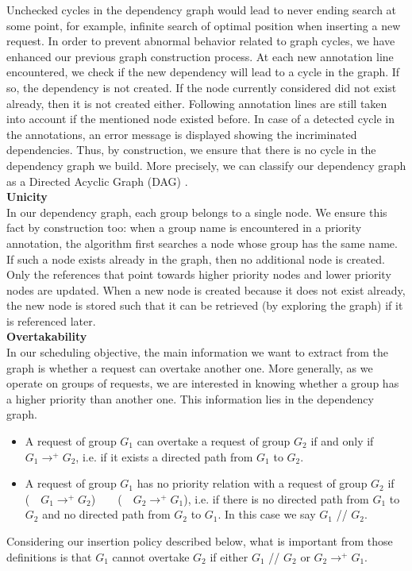 \documentclass[11pt]{report}
\begin{document}
Unchecked cycles in the dependency graph would lead to never ending search at some point, for example, infinite search of optimal position when inserting a new request. In order to prevent abnormal behavior related to graph cycles, we have enhanced our previous graph construction process. At each new annotation line encountered, we check if the new dependency will lead to a cycle in the graph. If so, the dependency is not created. If the node currently considered did not exist already, then it is not created either. Following annotation lines are still taken into account if the mentioned node existed before. In case of a detected cycle in the annotations, an error message is displayed showing the incriminated dependencies. Thus, by construction, we ensure that there is no cycle in the dependency graph we build. More precisely, we can classify our dependency graph as a Directed Acyclic Graph (DAG) \cite{ref:gallai1968directed}.\\

\textbf{Unicity}\\
In our dependency graph, each group belongs to a single node. We ensure this fact by construction too: when a group name is encountered in a priority annotation, the algorithm first searches a node whose group has the same name. If such a node exists already in the graph, then no additional node is created. Only the references that point towards higher priority nodes and lower priority nodes are updated. When a new node is created because it does not exist already, the new node is stored such that it can be retrieved (by exploring the graph) if it is referenced later.\\

\textbf{Overtakability}\\
In our scheduling objective, the main information we want to extract from the graph is whether a request can overtake another one. More generally, as we operate on groups of requests, we are interested in knowing whether a group has a higher priority than another one. This information lies in the dependency graph.
\begin{itemize}
\item A request of group $G_1$ can overtake a request of group $G_2$ if and only if $G_1\longrightarrow^{+}G_2$, i.e. if it exists a directed path from $G_1$ to $G_2$.
\item A request of group $G_1$ has no priority relation with a request of group $G_2$ if (\lnot~\ $G_1\longrightarrow^{+}G_2$)~\ \wedge~\  (\lnot~\ $G_2\longrightarrow^{+}G_1$), i.e. if there is no directed path from $G_1$ to $G_2$ and no directed path from $G_2$ to $G_1$. In this case we say $G_1$ // $G_2$.
\end{itemize}
Considering our insertion policy described below, what is important from those definitions is that $G_1$ cannot overtake $G_2$ if either $G_1$ // $G_2$ or $G_2\longrightarrow^{+}G_1$.\\
\end{document}
